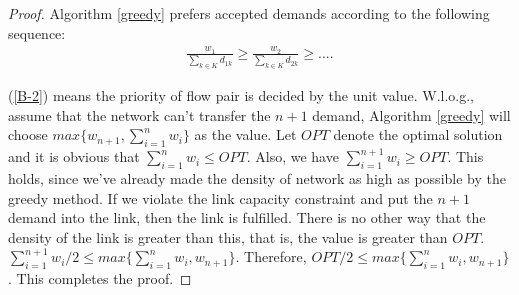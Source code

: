 \documentclass[sigconf]{acmart}
\begin{document}
\begin{appendices}
\begin{proof}
Algorithm \ref{greedy} prefers accepted demands according to the following sequence:
 \begin{eqnarray} \label{B-2}
\frac{w_1}{\sum_{k\in K} d_{1k}} \ge \frac{w_2}{\sum_{k\in K}d_{2k}} \ge ....
\end{eqnarray}

(\ref{B-2})  means the priority of flow pair is decided by the unit value.
W.l.o.g., assume that the network can't transfer the $n+1$ demand,  Algorithm \ref{greedy} will choose $max\{w_{n+1},\sum_{i=1}^{n}w_i\}$ as the value.
Let $OPT$ denote the optimal solution and it is obvious that  $\sum_{i=1}^{n} w_i\le OPT$.
Also, we have  $\sum_{i=1}^{n+1} w_i\ge OPT$.
This holds, since we've already made the density of network as high as possible by the greedy method.
If we violate the link capacity constraint and put the $n+1$ demand into the link, then the link is fulfilled.
There is no other way that the density of the link is greater than this, that is, the value is greater than $OPT$. 
 $\sum_{i=1}^{n+1} w_i/2 \le max\{\sum_{i=1}^{n} w_i,w_{n+1}\}$.
 Therefore, $OPT/2 \le max\{\sum_{i=1}^{n} w_i,w_{n+1}\}$. This completes the
proof.
\end{proof}







 \end{appendices}


\clearpage
\end{document}
